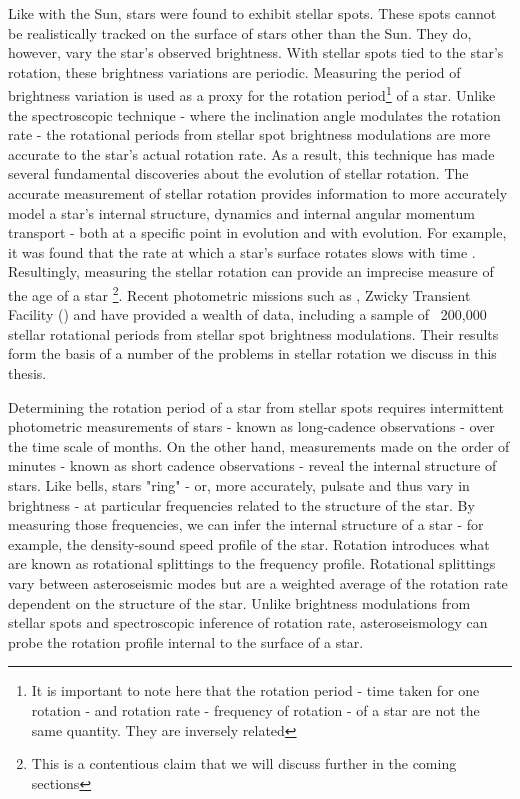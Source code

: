 Like with the Sun, stars were found to exhibit stellar spots. These spots cannot be realistically tracked on the surface of stars other than the Sun. 
They do, however, vary the star's observed brightness.
With stellar spots tied to the star's rotation, these brightness variations are periodic. 
Measuring the period of brightness variation is used as a proxy for the rotation period\footnote{It is important to note here that the rotation period - time taken for one rotation -  and rotation rate - frequency of rotation - of a star are not the same quantity. They are inversely related} of a star. Unlike the spectroscopic technique - where the inclination angle modulates the rotation rate  - the rotational periods from stellar spot brightness modulations are more accurate to the star's actual rotation rate.
As a result, this technique has made several fundamental discoveries about the evolution of stellar rotation.
The accurate measurement of stellar rotation provides information to more accurately model a star's internal structure, dynamics and internal angular momentum transport - both at a specific point in evolution and with evolution.
For example, it was found that the rate at which a star's surface rotates slows with time \citep{skumanich_time_1972}.
Resultingly, measuring the stellar rotation can provide an imprecise measure of the age of a star \footnote{This is a contentious claim that we will discuss further in the coming sections}. Recent photometric missions such as \kepler{} \citep{borucki_kepler_2010,beck_kepler_2011}, Zwicky Transient Facility (\ZTF) \citep{lu_bridging_2022} and \gaia{} \citep{distefano_gaia_2022} have provided a wealth of data, including a sample of ~200,000 stellar rotational periods from stellar spot brightness modulations. Their results form the basis of a number of the problems in stellar rotation we discuss in this thesis. 

Determining the rotation period of a star from stellar spots requires intermittent photometric measurements of stars - known as long-cadence observations - over the time scale of months. 
On the other hand, measurements made on the order of minutes - known as short cadence observations - reveal the internal structure of stars.
Like bells, stars "ring" - or, more accurately, pulsate and thus vary in brightness -  at particular frequencies related to the structure of the star.
By measuring those frequencies, we can infer the internal structure of a star - for example, the density-sound speed profile of the star.
Rotation introduces what are known as rotational splittings to the frequency profile.
Rotational splittings vary between asteroseismic modes but are a weighted average of the rotation rate dependent on the structure of the star. 
Unlike brightness modulations from stellar spots and spectroscopic inference of rotation rate, asteroseismology can probe the rotation profile internal to the surface of a star.

